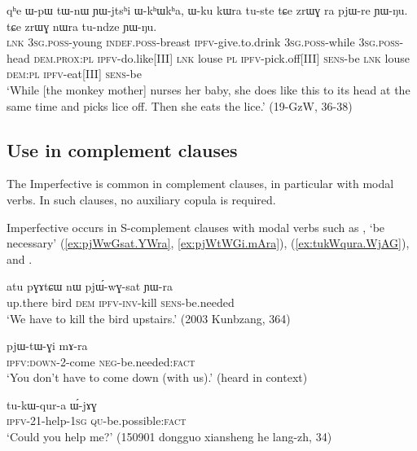 \begin{exe}
\ex \label{ex:YWjtshi.WkhWkha}
\gll qʰe ɯ-pɯ tɯ-nɯ ɲɯ-jtsʰi ɯ-kʰɯkʰa,  ɯ-ku kɯra tu-ste tɕe zrɯɣ ra pjɯ-re ɲɯ-ŋu.  tɕe zrɯɣ nɯra tu-ndze ɲɯ-ŋu. \\
\textsc{lnk} \textsc{3sg}.\textsc{poss}-young \textsc{indef}.\textsc{poss}-breast \textsc{ipfv}-give.to.drink \textsc{3sg}.\textsc{poss}-while \textsc{3sg}.\textsc{poss}-head \textsc{dem}.\textsc{prox}:\textsc{pl} \textsc{ipfv}-do.like[III] \textsc{lnk} louse \textsc{pl} \textsc{ipfv}-pick.off[III] \textsc{sens}-be \textsc{lnk} louse \textsc{dem}:\textsc{pl} \textsc{ipfv}-eat[III] \textsc{sens}-be \\
\glt `While [the monkey mother] nurses her baby, she does like this to its head at the same time and picks lice off. Then she eats the lice.' (19-GzW, 36-38)
\end{exe}

\subsection{Use in complement clauses} \label{sec:ipfv.complement}
The Imperfective is common in complement clauses, in particular with modal verbs. In such clauses, no auxiliary copula is required.

Imperfective occurs in S-complement clauses with modal verbs such as , `be necessary' (\ref{ex:pjWwGsat.YWra}, \ref{ex:pjWtWGi.mAra}),  (\ref{ex:tukWqura.WjAG}),  and . 

\begin{exe}
\ex \label{ex:pjWwGsat.YWra}
\gll  atu pɣɤtɕɯ nɯ pjɯ́-wɣ-sat ɲɯ-ra \\
up.there bird \textsc{dem} \textsc{ipfv}-\textsc{inv}-kill \textsc{sens}-be.needed \\
\glt `We have to kill the bird upstairs.' (2003 Kunbzang, 364)
\end{exe}

\begin{exe}
\ex \label{ex:pjWtWGi.mAra}
\gll pjɯ-tɯ-ɣi mɤ-ra \\
\textsc{ipfv}:\textsc{down}-2-come \textsc{neg}-be.needed:\textsc{fact} \\
\glt `You don't have to come down (with us).' (heard in context)
\end{exe}

\begin{exe}
\ex \label{ex:tukWqura.WjAG}
\gll tu-kɯ-qur-a ɯ́-jɤɣ \\
\textsc{ipfv}-2\fl{}1-help-\textsc{1sg} \textsc{qu}-be.possible:\textsc{fact} \\
\glt `Could you help me?' (150901 dongguo xiansheng he lang-zh, 34)
\end{exe}

